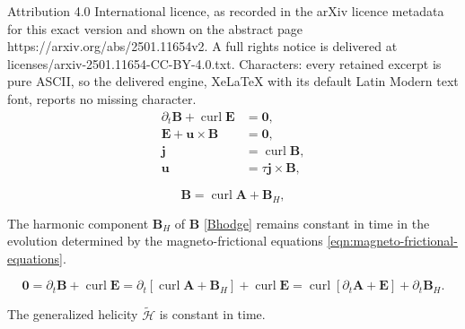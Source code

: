 \documentclass[10pt,a4paper]{amsart}
\newcommand\curl{\operatorname{curl}}
\begin{document}
Attribution 4.0 International licence, as recorded in the arXiv licence metadata for this exact version and shown on the abstract page https://arxiv.org/abs/2501.11654v2. A full rights notice is delivered at licenses/arxiv-2501.11654-CC-BY-4.0.txt. Characters: every retained excerpt is pure ASCII, so the delivered engine, XeLaTeX with its default Latin Modern text font, reports no missing character.
\begin{subequations}\label{eqn:magneto-frictional-equations}
\begin{align}
    \label{eqn:magnetic-advection}\partial_t \bm{B} + \curl\bm{E}&=\bm{0},\\
    \label{eqn:electric-field}\bm{E}+ \bm{u}\times\bm{B} &= \bm{0}, \\
    \bm{j}& = \curl\bm{B}, \\
    \label{eqn:velocity}\bm{u} &= \tau \bm{j}\times\bm{B},
\end{align}
\end{subequations}

\begin{equation}\label{Bhodge}
    \bm B = \curl \bm A + \bm B_{H},
\end{equation}

\begin{theorem}\label{thm:harmonic-form-constant}
    The harmonic component $\bm B_H$ of $\bm B$ \eqref{Bhodge} remains constant in time in the evolution determined by the magneto-frictional equations \eqref{eqn:magneto-frictional-equations}. 
\end{theorem}

    \begin{equation}\label{eqn:magnetic-adv}
        \bm 0
        = \partial_t \bm B + \curl \bm E
        = \partial_t [\curl \bm A + \bm B_H] + \curl \bm E
        = \curl [\partial_t \bm A + \bm E] + \partial_t \bm B_H.
    \end{equation}

\begin{theorem}\label{thm:conservation-general-helicity}
    The generalized helicity $\tilde{\mathcal{H}}$ is constant in time.
\end{theorem}
\end{document}
